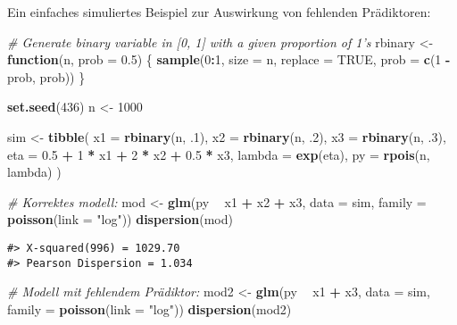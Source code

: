 \documentclass[ngerman,a4paper,]{scrartcl}
\newenvironment{Shaded}{\begin{snugshade}}{\end{snugshade}}
\newcommand{\CommentTok}[1]{\textcolor[rgb]{0.56,0.35,0.01}{\textit{#1}}}
\newcommand{\ControlFlowTok}[1]{\textcolor[rgb]{0.13,0.29,0.53}{\textbf{#1}}}
\newcommand{\DataTypeTok}[1]{\textcolor[rgb]{0.13,0.29,0.53}{#1}}
\newcommand{\DecValTok}[1]{\textcolor[rgb]{0.00,0.00,0.81}{#1}}
\newcommand{\FloatTok}[1]{\textcolor[rgb]{0.00,0.00,0.81}{#1}}
\newcommand{\KeywordTok}[1]{\textcolor[rgb]{0.13,0.29,0.53}{\textbf{#1}}}
\newcommand{\NormalTok}[1]{#1}
\newcommand{\OperatorTok}[1]{\textcolor[rgb]{0.81,0.36,0.00}{\textbf{#1}}}
\newcommand{\OtherTok}[1]{\textcolor[rgb]{0.56,0.35,0.01}{#1}}
\newcommand{\StringTok}[1]{\textcolor[rgb]{0.31,0.60,0.02}{#1}}
\theoremstyle{definition}
\theoremstyle{definition}
\theoremstyle{definition}
\theoremstyle{remark}
\begin{document}
Ein einfaches simuliertes Beispiel zur Auswirkung von fehlenden Prädiktoren:

\begin{Shaded}
\begin{Highlighting}[]
\CommentTok{# Generate binary variable in [0, 1] with a given proportion of 1's}
\NormalTok{rbinary <-}\StringTok{ }\ControlFlowTok{function}\NormalTok{(n, }\DataTypeTok{prob =} \FloatTok{0.5}\NormalTok{) \{}
  \KeywordTok{sample}\NormalTok{(}\DecValTok{0}\OperatorTok{:}\DecValTok{1}\NormalTok{, }\DataTypeTok{size =}\NormalTok{ n, }\DataTypeTok{replace =} \OtherTok{TRUE}\NormalTok{, }\DataTypeTok{prob =} \KeywordTok{c}\NormalTok{(}\DecValTok{1} \OperatorTok{-}\StringTok{ }\NormalTok{prob, prob))}
\NormalTok{\}}

\KeywordTok{set.seed}\NormalTok{(}\DecValTok{436}\NormalTok{)}
\NormalTok{n <-}\StringTok{ }\DecValTok{1000}

\NormalTok{sim <-}\StringTok{ }\KeywordTok{tibble}\NormalTok{(}
  \DataTypeTok{x1 =} \KeywordTok{rbinary}\NormalTok{(n, }\FloatTok{.1}\NormalTok{),}
  \DataTypeTok{x2 =} \KeywordTok{rbinary}\NormalTok{(n, }\FloatTok{.2}\NormalTok{),}
  \DataTypeTok{x3 =} \KeywordTok{rbinary}\NormalTok{(n, }\FloatTok{.3}\NormalTok{),}
  \DataTypeTok{eta =} \FloatTok{0.5} \OperatorTok{+}\StringTok{ }\DecValTok{1} \OperatorTok{*}\StringTok{ }\NormalTok{x1 }\OperatorTok{+}\StringTok{ }\DecValTok{2} \OperatorTok{*}\StringTok{ }\NormalTok{x2 }\OperatorTok{+}\StringTok{ }\FloatTok{0.5} \OperatorTok{*}\StringTok{ }\NormalTok{x3,}
  \DataTypeTok{lambda =} \KeywordTok{exp}\NormalTok{(eta),}
  \DataTypeTok{py =} \KeywordTok{rpois}\NormalTok{(n, lambda)}
\NormalTok{)}

\CommentTok{# Korrektes modell:}
\NormalTok{mod <-}\StringTok{ }\KeywordTok{glm}\NormalTok{(py }\OperatorTok{~}\StringTok{ }\NormalTok{x1 }\OperatorTok{+}\StringTok{ }\NormalTok{x2 }\OperatorTok{+}\StringTok{ }\NormalTok{x3, }\DataTypeTok{data =}\NormalTok{ sim, }\DataTypeTok{family =} \KeywordTok{poisson}\NormalTok{(}\DataTypeTok{link =} \StringTok{"log"}\NormalTok{))}
\KeywordTok{dispersion}\NormalTok{(mod)}
\end{Highlighting}
\end{Shaded}

\begin{verbatim}
#> X-squared(996) = 1029.70
#> Pearson Dispersion = 1.034
\end{verbatim}

\begin{Shaded}
\begin{Highlighting}[]
\CommentTok{# Modell mit fehlendem Prädiktor:}
\NormalTok{mod2 <-}\StringTok{ }\KeywordTok{glm}\NormalTok{(py }\OperatorTok{~}\StringTok{ }\NormalTok{x1 }\OperatorTok{+}\StringTok{ }\NormalTok{x3, }\DataTypeTok{data =}\NormalTok{ sim, }\DataTypeTok{family =} \KeywordTok{poisson}\NormalTok{(}\DataTypeTok{link =} \StringTok{"log"}\NormalTok{))}
\KeywordTok{dispersion}\NormalTok{(mod2)}
\end{Highlighting}
\end{Shaded}
\end{document}
